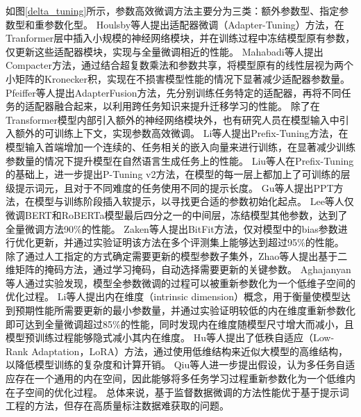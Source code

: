 如图\ref{delta_tuning}所示，参数高效微调方法主要分为三类：额外参数型、指定参数型和重参数化型。
Houlsby等人\cite{DBLP:conf/icml/HoulsbyGJMLGAG19}提出适配器微调（Adapter-Tuning）方法，在Tranformer层中插入小规模的神经网络模块，并在训练过程中冻结模型原有参数，仅更新这些适配器模块，实现与全量微调相近的性能。
Mahabadi等人\cite{DBLP:conf/nips/MahabadiHR21}提出Compacter方法，通过结合超复数乘法和参数共享，将模型原有的线性层视为两个小矩阵的Kronecker积，实现在不损害模型性能的情况下显著减少适配器参数量。
Pfeiffer等人\cite{DBLP:conf/eacl/PfeifferKRCG21}提出AdapterFusion方法，先分别训练任务特定的适配器，再将不同任务的适配器融合起来，以利用跨任务知识来提升迁移学习的性能。
除了在Transformer模型内部引入额外的神经网络模块外，也有研究人员在模型输入中引入额外的可训练上下文，实现参数高效微调。
Li等人\cite{DBLP:conf/acl/LiL20}提出Prefix-Tuning方法，在模型输入首端增加一个连续的、任务相关的嵌入向量来进行训练，在显著减少训练参数量的情况下提升模型在自然语言生成任务上的性能。
Liu等人\cite{DBLP:journals/corr/abs-2110-07602}在Prefix-Tuning的基础上，进一步提出P-Tuning v2方法，在模型的每一层上都加上了可训练的层级提示词元，且对于不同难度的任务使用不同的提示长度。
Gu等人\cite{DBLP:conf/acl/GuHLH22}提出PPT方法，在模型与训练阶段插入软提示，以寻找更合适的参数初始化起点。
Lee等人\cite{DBLP:journals/corr/abs-1911-03090}仅微调BERT和RoBERTa模型最后四分之一的中间层，冻结模型其他参数，达到了全量微调方法90\%的性能。
Zaken等人\cite{DBLP:conf/acl/ZakenGR22}提出BitFit方法，仅对模型中的bias参数进行优化更新，并通过实验证明该方法在多个评测集上能够达到超过95\%的性能。
除了通过人工指定的方式确定需要更新的模型参数子集外，Zhao等人\cite{DBLP:conf/emnlp/ZhaoLMJS20}提出基于二维矩阵的掩码方法，通过学习掩码，自动选择需要更新的关键参数。
Aghajanyan等人\cite{DBLP:conf/acl/AghajanyanGZ20}通过实验发现，模型全参数微调的过程可以被重新参数化为一个低维子空间的优化过程。
Li等人\cite{DBLP:conf/iclr/LiFLY18}提出内在维度（intrinsic dimension）概念，用于衡量使模型达到预期性能所需要更新的最小参数量，并通过实验证明较低的内在维度重新参数化即可达到全量微调超过85\%的性能，同时发现内在维度随模型尺寸增大而减小，且模型预训练过程能够隐式减小其内在维度。
Hu等人\cite{DBLP:conf/iclr/HuSWALWWC22}提出了低秩自适应（Low-Rank Adaptation，LoRA）方法，通过使用低维结构来近似大模型的高维结构，以降低模型训练的复杂度和计算开销。
Qiu等人\cite{DBLP:journals/corr/abs-2110-07867}进一步提出假设，认为多任务自适应存在一个通用的内在空间，因此能够将多任务学习过程重新参数化为一个低维内在子空间的优化过程。
总体来说，基于监督数据微调的方法性能优于基于提示词工程的方法，但存在高质量标注数据难获取的问题。

